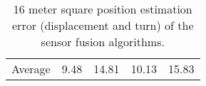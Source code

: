 \begin{table}[H]
\begin{center}
{\begin{tabular}[t]{lcccc}
                \hline
                Average          & 9.48                    & 14.81                  & 10.13           & 15.83
            \end{tabular}
        }
    \end{center}
    \caption{16 meter square position estimation error (displacement and turn) of the sensor fusion algorithms. }
    \label{tab:16_square}

\end{table}